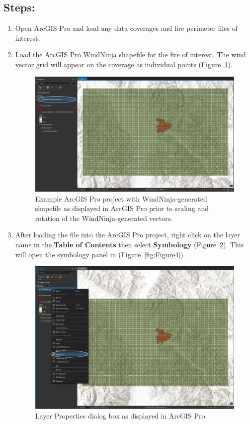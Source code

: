 \documentclass[12pt]{article}
\begin{document}
\subsection*{Steps:}
\begin{enumerate}
\item Open ArcGIS Pro and load any data coverages and fire perimeter files of interest.
\item Load the ArcGIS Pro WindNinja shapefile for the fire of interest. The wind vector grid will appear on the
coverage as individual points (Figure~\ref{fig:Figure2}).

\begin{figure}[H]
	\centering
	\includegraphics[scale=0.3]{arc_2.png}
	\caption{Example ArcGIS Pro project with WindNinja-generated shapefile as displayed in ArcGIS Pro prior to scaling and rotation of the
WindNinja-generated vectors.}
\label{fig:Figure2}
\end{figure}

\item After loading the file into the ArcGIS Pro project, right click on the layer name in the  \textbf{Table of Contents} then select \textbf{Symbology} (Figure~\ref{fig:Figure3}). This will open the symbology panel in (Figure~\ref{fig:Figure4}). 

\begin{figure}[H]
	\centering
	\includegraphics[scale=0.3]{arc_3.png}
	\caption{Layer Properties dialog box as displayed in ArcGIS Pro.}
\label{fig:Figure3}
\end{figure}


\end{enumerate}
\end{document}
